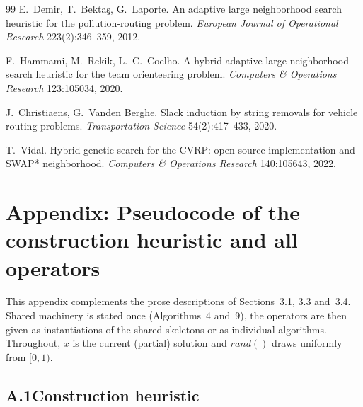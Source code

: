 \documentclass[10pt, a4paper]{article}
\begin{document}
\begin{thebibliography}{99}
 E.~Demir, T.~Bekta\c{s}, G.~Laporte.
An adaptive large neighborhood search heuristic for the pollution-routing
problem. \emph{European Journal of Operational Research} 223(2):346--359,
2012.

 F.~Hammami, M.~Rekik, L.~C.~Coelho.
A hybrid adaptive large neighborhood search heuristic for the team
orienteering problem. \emph{Computers \& Operations Research} 123:105034,
2020.

 J.~Christiaens, G.~Vanden Berghe.
Slack induction by string removals for vehicle routing problems.
\emph{Transportation Science} 54(2):417--433, 2020.

 T.~Vidal.
Hybrid genetic search for the CVRP: open-source implementation and SWAP*
neighborhood. \emph{Computers \& Operations Research} 140:105643, 2022.
\end{thebibliography}

\appendix
\section*{Appendix: Pseudocode of the construction heuristic and all operators}

This appendix complements the prose descriptions of Sections~3.1, 3.3
and~3.4. Shared machinery is stated once (Algorithms~4 and~9), the
operators are then given as instantiations of the shared skeletons or as
individual algorithms. Throughout, $x$ is the current (partial) solution
and $\mathit{rand}()$ draws uniformly from $[0,1)$.

\subsection*{A.1\quad Construction heuristic}
\end{document}
